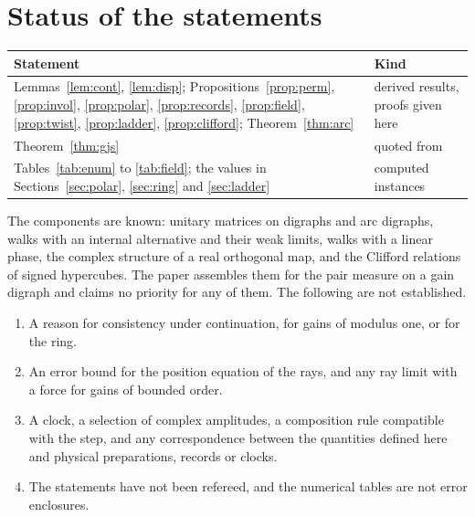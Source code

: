 \section{Status of the statements}

\begin{center}\small
\begin{tabular}{@{}p{}p{}@{}}\toprule
Statement & Kind\\\midrule
Lemmas~\ref{lem:cont}, \ref{lem:disp}; Propositions~\ref{prop:perm}, \ref{prop:invol}, \ref{prop:polar}, \ref{prop:records}, \ref{prop:field}, \ref{prop:twist}, \ref{prop:ladder}, \ref{prop:clifford}; Theorem~\ref{thm:arc} & derived results, proofs given here\\
Theorem~\ref{thm:gjs} & quoted from \cite{gjs}\\
Tables~\ref{tab:enum} to \ref{tab:field}; the values in Sections~\ref{sec:polar}, \ref{sec:ring} and \ref{sec:ladder} & computed instances\\\bottomrule
\end{tabular}
\end{center}

The components are known: unitary matrices on digraphs and arc digraphs, walks with an internal alternative and their weak limits, walks with a linear phase, the complex structure of a real orthogonal map, and the Clifford relations of signed hypercubes. The paper assembles them for the pair measure on a gain digraph and claims no priority for any of them. The following are not established.
\begin{enumerate}[label=(\roman*)]
\item A reason for consistency under continuation, for gains of modulus one, or for the ring.
\item An error bound for the position equation of the rays, and any ray limit with a force for gains of bounded order.
\item A clock, a selection of complex amplitudes, a composition rule compatible with the step, and any correspondence between the quantities defined here and physical preparations, records or clocks.
\item The statements have not been refereed, and the numerical tables are not error enclosures.
\end{enumerate}
